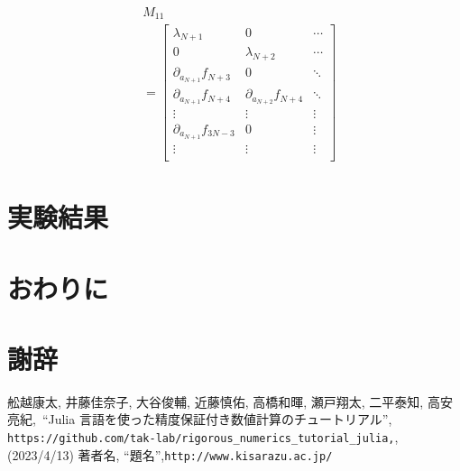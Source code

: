 \documentclass[11pt,a4paper,titlepage]{jsreport}
\theoremstyle{definition}
\begin{document}
\begin{equation}
  \begin{split}
    &M_{11} \\
    &= \begin{bmatrix}
      \lambda_{N+1} & 0 & \cdots \\
      0 & \lambda_{N+2} & \cdots \\
      \partial_{a_{N+1}} f_{N+3} & 0 & \ddots \\
      \partial_{a_{N+1}} f_{N+4} & \partial_{a_{N+2}} f_{N+4} & \ddots \\
      \vdots & \vdots & \vdots \\
      \partial_{a_{N+1}} f_{3N-3} & 0 & \vdots \\
      \vdots & \vdots & \vdots \\
    \end{bmatrix}
  \end{split}
\end{equation}

\chapter{実験結果}

\chapter{おわりに}

\chapter*{謝辞}

\begin{thebibliography}{99}
   舩越康太, 井藤佳奈子, 大谷俊輔, 近藤慎佑, 高橋和暉, 瀬戸翔太, 二平泰知, 高安亮紀,\
  ``Julia 言語を使った精度保証付き数値計算のチュートリアル'',\linebreak
  \verb|https://github.com/tak-lab/rigorous_numerics_tutorial_julia,|,(2023/4/13)
  \bibitem{lit:name} 著者名, ``題名'',\linebreak \verb|http://www.kisarazu.ac.jp/|
\end{thebibliography}




\end{document}
